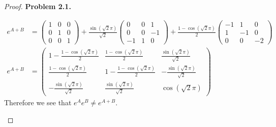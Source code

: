 \documentclass[11pt]{article}
\theoremstyle{definition}
\begin{document}
\begin{proof}{\textbf{Problem 2.1.}}
\begin{itemize}
\begin{align*}
        e^{A + B} &= \begin{pmatrix}
            1 & 0 & 0\\
            0 & 1 & 0\\
            0 & 0 & 1
        \end{pmatrix}
        + \frac{\sin(\sqrt{2}\pi)}{\sqrt{2}}\begin{pmatrix}
            0 & 0 & 1\\
            0 & 0 & -1\\
            -1 & 1 & 0
        \end{pmatrix}
        + \frac{1 - \cos(\sqrt{2}\pi)}{2}\begin{pmatrix}
            -1 & 1 & 0\\
            1 & -1 & 0\\
            0 & 0 & -2
        \end{pmatrix}\\
        e^{A + B} &= \begin{pmatrix}
            1-\frac{1 - \cos(\sqrt{2}\pi)}{2} &
            \frac{1 - \cos(\sqrt{2}\pi)}{2} &
            \frac{\sin(\sqrt{2}\pi)}{\sqrt{2}}\\
            \frac{1 - \cos(\sqrt{2}\pi)}{2} &
            1 -\frac{1 - \cos(\sqrt{2}\pi)}{2} &
            -\frac{\sin(\sqrt{2}\pi)}{\sqrt{2}}\\
            -\frac{\sin(\sqrt{2}\pi)}{\sqrt{2}} &
            \frac{\sin(\sqrt{2}\pi)}{\sqrt{2}} &
            \cos(\sqrt{2}\pi)
        \end{pmatrix}
    \end{align*}
    Therefore we see that $e^Ae^B \neq e^{A + B}$.


\end{itemize}
\end{proof}
\end{document}
